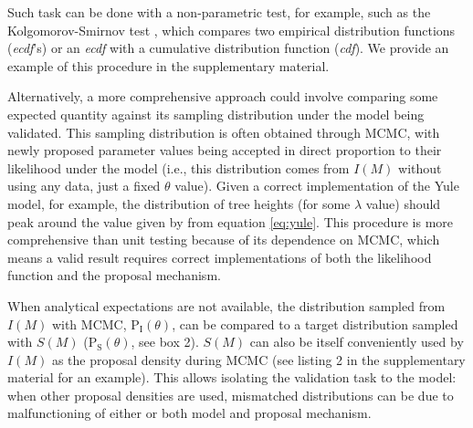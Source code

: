 \documentclass[oneside]{article}
\begin{document}
\begin{tcolorbox}[breakable, width=\textwidth, colback=gray!10, boxrule=0pt,
  title=Box 2: Additional validation sanity-checks, fonttitle=\bfseries]
  \vspace{.15cm}
  Such task can be done with a non-parametric test, for example, such
  as the Kolgomorov-Smirnov test \citep{kolgomorov,smirnov,ks}, which
  compares two empirical distribution functions (\emph{ecdf}'s) or an
  \emph{ecdf} with a cumulative distribution function (\emph{cdf}).
  We provide an example of this procedure in the supplementary material.
\end{tcolorbox}

Alternatively, a more comprehensive approach could involve comparing
some expected quantity against its sampling distribution under the
model being validated.
This sampling distribution is often obtained through MCMC, with
newly proposed parameter values being accepted in direct proportion to
their likelihood under the model (i.e., this distribution comes from
$I(M)$ without using any data, just a fixed $\theta$ value).
Given a correct implementation of the Yule model,
for example, the distribution of tree heights (for some $\lambda$
value) should peak around the value given by from equation \ref{eq:yule}.
This procedure is more comprehensive than unit testing because of its
dependence on MCMC, which means a valid result requires correct
implementations of both the likelihood function and the proposal mechanism.

When analytical expectations are not available, the distribution
sampled from $I(M)$ with MCMC, $\text{P}_{\text{I}}(\theta)$, can be
compared to a target distribution sampled with $S(M)$
($\text{P}_{\text{S}}(\theta)$, see box 2).
$S(M)$ can also be itself conveniently used by $I(M)$ as the proposal
density during MCMC (see listing 2 in the supplementary material for
an example).
This allows isolating the validation task to the model:
when other proposal densities are used, mismatched distributions can be
due to malfunctioning of either or both model and proposal mechanism.



\end{document}

